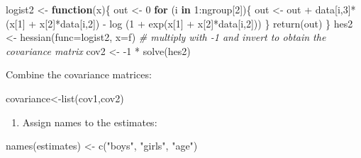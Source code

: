 \documentclass[
]{book}
\newenvironment{Shaded}{\begin{snugshade}}{\end{snugshade}}
\newcommand{\AttributeTok}[1]{\textcolor[rgb]{0.77,0.63,0.00}{#1}}
\newcommand{\CommentTok}[1]{\textcolor[rgb]{0.56,0.35,0.01}{\textit{#1}}}
\newcommand{\ControlFlowTok}[1]{\textcolor[rgb]{0.13,0.29,0.53}{\textbf{#1}}}
\newcommand{\DecValTok}[1]{\textcolor[rgb]{0.00,0.00,0.81}{#1}}
\newcommand{\FunctionTok}[1]{\textcolor[rgb]{0.00,0.00,0.00}{#1}}
\newcommand{\NormalTok}[1]{#1}
\newcommand{\OtherTok}[1]{\textcolor[rgb]{0.56,0.35,0.01}{#1}}
\newcommand{\SpecialCharTok}[1]{\textcolor[rgb]{0.00,0.00,0.00}{#1}}
\newcommand{\StringTok}[1]{\textcolor[rgb]{0.31,0.60,0.02}{#1}}
\providecommand{\tightlist}{%
  \setlength{\itemsep}{0pt}\setlength{\parskip}{0pt}}
\begin{document}
\begin{Shaded}
\begin{Highlighting}[]
\NormalTok{logist2 }\OtherTok{\textless{}{-}} \ControlFlowTok{function}\NormalTok{(x)\{}
\NormalTok{  out }\OtherTok{\textless{}{-}} \DecValTok{0}
  \ControlFlowTok{for}\NormalTok{ (i }\ControlFlowTok{in} \DecValTok{1}\SpecialCharTok{:}\NormalTok{ngroup[}\DecValTok{2}\NormalTok{])\{ }
\NormalTok{    out }\OtherTok{\textless{}{-}}\NormalTok{ out }\SpecialCharTok{+}\NormalTok{ data[i,}\DecValTok{3}\NormalTok{]}\SpecialCharTok{*}\NormalTok{(x[}\DecValTok{1}\NormalTok{] }\SpecialCharTok{+}\NormalTok{ x[}\DecValTok{2}\NormalTok{]}\SpecialCharTok{*}\NormalTok{data[i,}\DecValTok{2}\NormalTok{]) }\SpecialCharTok{{-}} \FunctionTok{log}\NormalTok{ (}\DecValTok{1} \SpecialCharTok{+}
    \FunctionTok{exp}\NormalTok{(x[}\DecValTok{1}\NormalTok{] }\SpecialCharTok{+}\NormalTok{ x[}\DecValTok{2}\NormalTok{]}\SpecialCharTok{*}\NormalTok{data[i,}\DecValTok{2}\NormalTok{]))}
\NormalTok{  \}}
  \FunctionTok{return}\NormalTok{(out)}
\NormalTok{\}}
\NormalTok{hes2 }\OtherTok{\textless{}{-}} \FunctionTok{hessian}\NormalTok{(}\AttributeTok{func=}\NormalTok{logist2, }\AttributeTok{x=}\NormalTok{f)}
\CommentTok{\# multiply with {-}1 and invert to obtain the covariance matrix}
\NormalTok{cov2 }\OtherTok{\textless{}{-}} \SpecialCharTok{{-}}\DecValTok{1} \SpecialCharTok{*} \FunctionTok{solve}\NormalTok{(hes2)}
\end{Highlighting}
\end{Shaded}

Combine the covariance matrices:

\begin{Shaded}
\begin{Highlighting}[]
\NormalTok{covariance}\OtherTok{\textless{}{-}}\FunctionTok{list}\NormalTok{(cov1,cov2)}
\end{Highlighting}
\end{Shaded}

\begin{enumerate}
\def\labelenumi{\arabic{enumi})}
\setcounter{enumi}{1}
\tightlist
\item
  Assign names to the estimates:
\end{enumerate}

\begin{Shaded}
\begin{Highlighting}[]
\FunctionTok{names}\NormalTok{(estimates) }\OtherTok{\textless{}{-}} \FunctionTok{c}\NormalTok{(}\StringTok{"boys"}\NormalTok{, }\StringTok{"girls"}\NormalTok{, }\StringTok{"age"}\NormalTok{)}
\end{Highlighting}
\end{Shaded}
\end{document}
